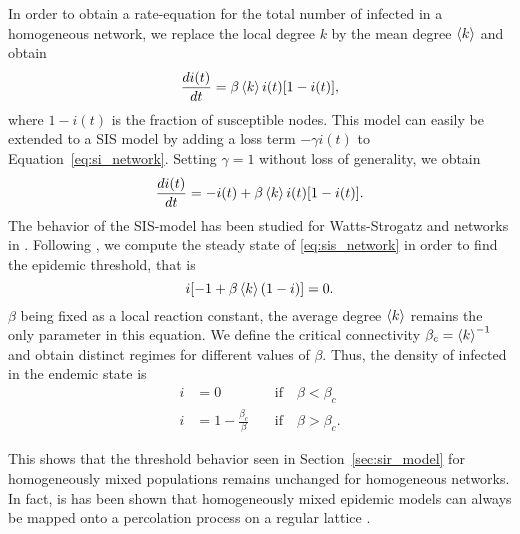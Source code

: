 In order to obtain a rate-equation for the total number of infected in a homogeneous network, we replace the local degree $k$ by the mean degree $\left< k \right>$ and obtain
\begin{equation}\label{eq:si_network}
\frac{di(t)}{dt}=\beta \left< k \right> i(t) [1-i(t)],
\end{equation}
where $1-i(t)$ is the fraction of susceptible nodes.
This model can easily be extended to a SIS model by adding a loss term $-\gamma i(t)$ to Equation~\eqref{eq:si_network}.
Setting $\gamma =1 $ without loss of generality, we obtain 
\begin{equation}\label{eq:sis_network}
\frac{di(t)}{dt}=-i(t)+ \beta \left< k \right> i(t) [1-i(t)] .
\end{equation}
The behavior of the SIS-model has been studied for Watts-Strogatz and \BA networks in \citep{Pastor-Satorras_vespi:2001}.
Following \citeauthor{Pastor-Satorras_vespi:2001}, we compute the steady state of \eqref{eq:sis_network} in order to find the epidemic threshold, that is
\[
i[-1+\beta \left< k \right> (1-i)]=0.
\]
$\beta $ being fixed as a local reaction constant, the average degree $\left< k \right>$ remains the only parameter in this equation.
We define the critical connectivity $\beta _c=\left< k \right>^{-1}$ and obtain distinct regimes for different values of $\beta $.
Thus, the density of infected in the endemic state is
\begin{align}\label{eq:endemic_ws}
i &= 0   & ~ &\mathrm{if} \quad \beta < \beta _c \nonumber \\
i &= 1-\frac{\beta _c}{\beta }  & ~ &\mathrm{if} \quad \beta > \beta _c .
\end{align}

This shows that the threshold behavior seen in Section~\ref{sec:sir_model} for homogeneously mixed populations remains unchanged for homogeneous networks.
In fact, is has been shown that homogeneously mixed epidemic models can always be mapped onto a percolation process on a regular lattice \citep{Grassberger1983157,Sander2002293}.

